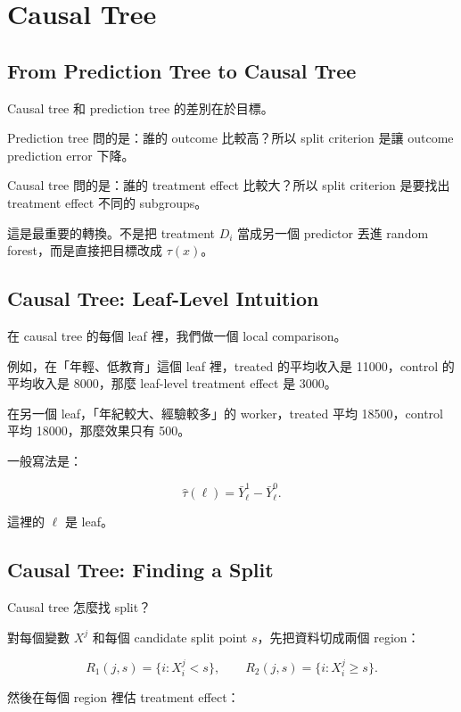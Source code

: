 \documentclass[
  chinese,
  11pt,
]{article}
\begin{document}
\section{Causal Tree}\label{causal-tree}

\subsection{From Prediction Tree to Causal
Tree}\label{from-prediction-tree-to-causal-tree}

Causal tree 和 prediction tree 的差別在於目標。

Prediction tree 問的是：誰的 outcome 比較高？所以 split criterion 是讓
outcome prediction error 下降。

Causal tree 問的是：誰的 treatment effect 比較大？所以 split criterion
是要找出 treatment effect 不同的 subgroups。

這是最重要的轉換。不是把 treatment \(D_i\) 當成另一個 predictor 丟進
random forest，而是直接把目標改成 \(\tau(x)\)。

\subsection{Causal Tree: Leaf-Level
Intuition}\label{causal-tree-leaf-level-intuition}

在 causal tree 的每個 leaf 裡，我們做一個 local comparison。

例如，在「年輕、低教育」這個 leaf 裡，treated 的平均收入是
11000，control 的平均收入是 8000，那麼 leaf-level treatment effect 是
3000。

在另一個 leaf，「年紀較大、經驗較多」的 worker，treated 平均
18500，control 平均 18000，那麼效果只有 500。

一般寫法是：

\[
\hat{\tau}(\ell)=\bar{Y}^{1}_{\ell}-\bar{Y}^{0}_{\ell}.
\]

這裡的 \(\ell\) 是 leaf。

\subsection{Causal Tree: Finding a
Split}\label{causal-tree-finding-a-split}

Causal tree 怎麼找 split？

對每個變數 \(X^j\) 和每個 candidate split point \(s\)，先把資料切成兩個
region：

\[
R_1(j,s)=\{i:X_i^j<s\},
\qquad
R_2(j,s)=\{i:X_i^j\geq s\}.
\]

然後在每個 region 裡估 treatment effect：
\end{document}
